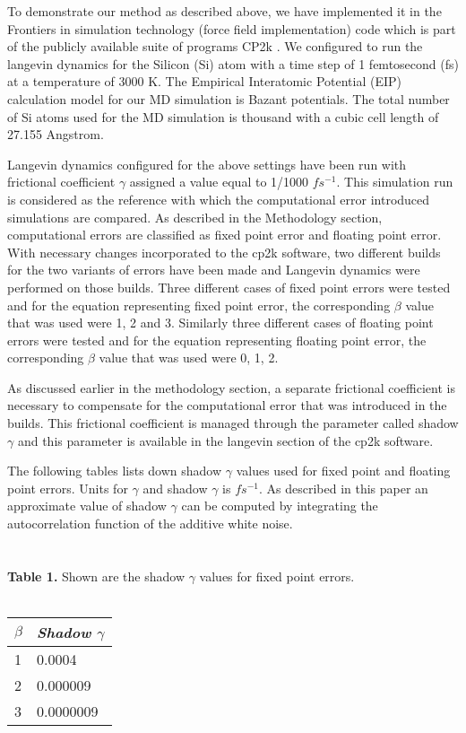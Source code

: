 To demonstrate our method as described above, we have implemented it in the Frontiers in simulation technology (force field implementation) code which is part of the publicly available suite of programs CP2k \cite{cp2kwebsite}. We configured to run the langevin dynamics for the Silicon (Si) atom with a time step of 1 femtosecond (fs) at a temperature of 3000 K. The Empirical Interatomic Potential (EIP) calculation model for our MD simulation is Bazant potentials. The total number of Si atoms used for the MD simulation is thousand with a cubic cell length of 27.155 Angstrom. 

Langevin dynamics configured for the above settings have been run with frictional coefficient \(\gamma\) assigned a value equal to 1/1000 \(fs^{-1}\). This simulation run is considered as the reference with which the computational error introduced simulations are compared. As described in the Methodology section, computational errors are classified as fixed point error and floating point error. With necessary changes incorporated to the cp2k software, two different builds for the two variants of errors have been made and Langevin dynamics were performed on those builds. Three different cases of fixed point errors were tested and for the equation representing fixed point error, the corresponding \(\beta\) value that was used were 1, 2 and 3. Similarly three different cases of floating point errors were tested and for the equation representing floating point error, the corresponding \(\beta\) value that was used were 0, 1, 2.

As discussed earlier in the methodology section, a separate frictional coefficient is necessary to compensate for the computational error that was  introduced in the builds. This frictional coefficient is managed through the parameter called shadow \(\gamma\) and this parameter is available in the langevin section of the cp2k software.   

The following tables lists down shadow \(\gamma\) values used for fixed point and floating point errors.  Units for \(\gamma\) and shadow \(\gamma\) is \(fs^{-1}\). As described in this paper \cite{ShadowGammaEstimate} an approximate value of shadow \(\gamma\) can be computed by integrating the autocorrelation function of the additive white noise. \\\\\\


\textbf{Table 1.} Shown are the shadow \(\gamma\) values for fixed point errors. \\ \\
\begin{table}[h!]
\begin{tabular}{|l|l|}
\hline
\textit{\(\beta\) } & \textit{Shadow \(\gamma\)} \\ \hline
1             & 0.0004                \\ \hline
2             & 0.000009              \\ \hline
3             & 0.0000009             \\ \hline
\end{tabular}
\end{table}


